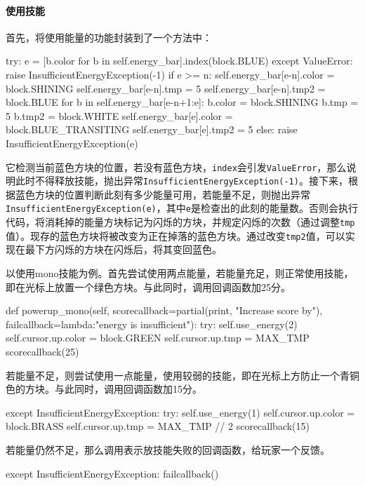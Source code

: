 \documentclass[UTF8]{article}
\begin{document}
\paragraph{使用技能} 首先，将使用能量的功能封装到了一个方法中：
\begin{python}
        try:
            e = [b.color for b in self.energy_bar].index(block.BLUE)
        except ValueError:
            raise InsufficientEnergyException(-1)
        if e >= n:
            self.energy_bar[e-n].color = block.SHINING
            self.energy_bar[e-n].tmp = 5
            self.energy_bar[e-n].tmp2 = block.BLUE
            for b in self.energy_bar[e-n+1:e]:
                b.color = block.SHINING
                b.tmp = 5
                b.tmp2 = block.WHITE
            self.energy_bar[e].color = block.BLUE_TRANSITING
            self.energy_bar[e].tmp2 = 5
        else:
            raise InsufficientEnergyException(e)
\end{python}
它检测当前蓝色方块的位置，若没有蓝色方块，\texttt{index}会引发\texttt{ValueError}，那么说明此时不得释放技能，抛出异常\texttt{InsufficientEnergyException(-1)}。接下来，根据蓝色方块的位置判断此刻有多少能量可用，若能量不足，则抛出异常\texttt{InsufficientEnergyException(e)}，其中\texttt{e}是检查出的此刻的能量数。否则会执行代码，将消耗掉的能量方块标记为闪烁的方块，并规定闪烁的次数（通过调整\texttt{tmp}值）。现存的蓝色方块将被改变为正在掉落的蓝色方块。通过改变\texttt{tmp2}值，可以实现在最下方闪烁的方块在闪烁后，将其变回蓝色。

以使用mono技能为例。首先尝试使用两点能量，若能量充足，则正常使用技能，即在光标上放置一个绿色方块。与此同时，调用回调函数加25分。
\begin{python}
    def powerup_mono(self, scorecallback=partial(print, "Increase score by"), failcallback=lambda:"energy is insufficient"):
        try:
            self.use_energy(2)
            self.cursor.up.color = block.GREEN
            self.cursor.up.tmp = MAX_TMP
            scorecallback(25)
\end{python}
若能量不足，则尝试使用一点能量，使用较弱的技能，即在光标上方防止一个青铜色的方块。与此同时，调用回调函数加15分。
\begin{python}
        except InsufficientEnergyException:
            try:
                self.use_energy(1)
                self.cursor.up.color = block.BRASS
                self.cursor.up.tmp = MAX_TMP // 2
                scorecallback(15)
\end{python}
若能量仍然不足，那么调用表示放技能失败的回调函数，给玩家一个反馈。
\begin{python}
            except InsufficientEnergyException:
                failcallback()
\end{python}
\end{document}

